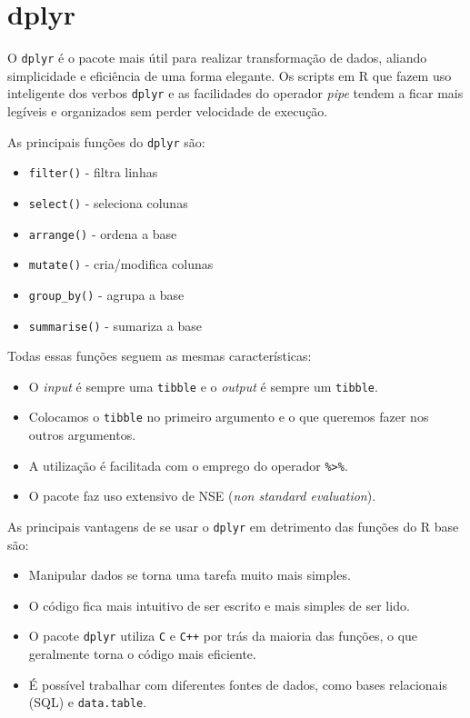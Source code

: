 \documentclass[
]{book}
\providecommand{\tightlist}{%
  \setlength{\itemsep}{0pt}\setlength{\parskip}{0pt}}
\begin{document}
\hypertarget{dplyr}{%
\section{dplyr}\label{dplyr}}

O \texttt{dplyr} é o pacote mais útil para realizar transformação de dados, aliando simplicidade e eficiência de uma forma elegante. Os scripts em R que fazem uso inteligente dos verbos \texttt{dplyr} e as facilidades do operador \emph{pipe} tendem a ficar mais legíveis e organizados sem perder velocidade de execução.

As principais funções do \texttt{dplyr} são:

\begin{itemize}
\tightlist
\item
  \texttt{filter()} - filtra linhas
\item
  \texttt{select()} - seleciona colunas
\item
  \texttt{arrange()} - ordena a base
\item
  \texttt{mutate()} - cria/modifica colunas
\item
  \texttt{group\_by()} - agrupa a base
\item
  \texttt{summarise()} - sumariza a base
\end{itemize}

Todas essas funções seguem as mesmas características:

\begin{itemize}
\tightlist
\item
  O \emph{input} é sempre uma \texttt{tibble} e o \emph{output} é sempre um \texttt{tibble}.
\item
  Colocamos o \texttt{tibble} no primeiro argumento e o que queremos fazer nos outros argumentos.
\item
  A utilização é facilitada com o emprego do operador \texttt{\%\textgreater{}\%}.
\item
  O pacote faz uso extensivo de NSE (\emph{non standard evaluation}).
\end{itemize}

As principais vantagens de se usar o \texttt{dplyr} em detrimento das funções do R base são:

\begin{itemize}
\tightlist
\item
  Manipular dados se torna uma tarefa muito mais simples.
\item
  O código fica mais intuitivo de ser escrito e mais simples de ser lido.
\item
  O pacote \texttt{dplyr} utiliza \texttt{C} e \texttt{C++} por trás da maioria das funções, o que geralmente torna o código mais eficiente.
\item
  É possível trabalhar com diferentes fontes de dados, como bases relacionais (SQL) e \texttt{data.table}.
\end{itemize}
\end{document}
